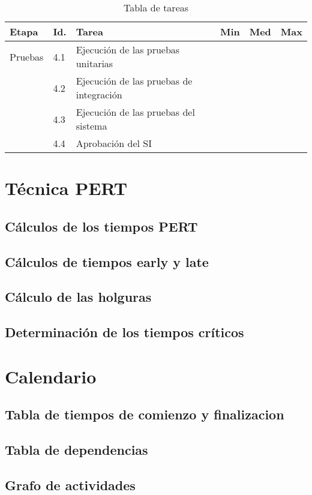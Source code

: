 \documentclass[11pt,a4paper,spanish,twoside]{report}
\begin{document}
\begin{table}[!h]
\centering
  \begin{tabular}{p{1.6cm}|p{1cm}|p{5cm}|p{1cm}|p{1cm}|p{1cm}}
    \textbf{Etapa} & \textbf{Id.} & \textbf{Tarea} & \textbf{Min} &
    \textbf{Med} & \textbf{Max}\\
    \hline
    Pruebas & 4.1 & Ejecución de las pruebas unitarias\\
    \cline{2-3}
    & 4.2 & Ejecución de las pruebas de integración\\
    \cline{2-3}
    & 4.3 & Ejecución de las pruebas del sistema\\
    \cline{2-3}
    & 4.4 & Aprobación del SI\\
    \hline
  \end{tabular}
  \caption{Tabla de tareas} \label{Tab:tareas4}
\end{table}


\chapter{Técnica PERT}
\section{Cálculos de los tiempos PERT}
\section{Cálculos de tiempos early y late}
\section{Cálculo de las holguras}
\section{Determinación de los tiempos críticos}

\chapter{Calendario}
\section{Tabla de tiempos de comienzo y finalizacion}
\section{Tabla de dependencias}
\section{Grafo de actividades}


 

\end{document}
